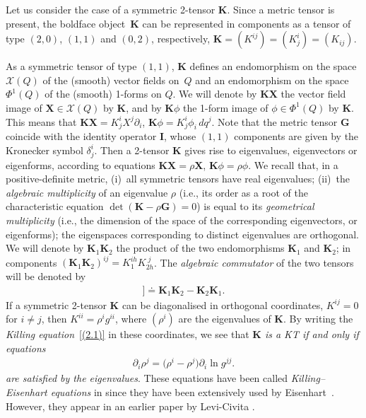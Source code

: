 \documentclass[10pt,a4paper]{amsart}
\def\bs{\boldsymbol}
\numberwithin{equation}{section}
\providecommand{\cal}{\mathcal}
\begin{document}
Let us consider the case of a symmetric 2-tensor $\bs K$. Since a metric tensor is present, the boldface object~$\bs K$ can be represented in components as a tensor of type $(2,0)$, $(1,1)$ and $(0,2)$, respectively, $\bs K= (K^{ij})=(K^i_j)=(K_{ij})$.

As a symmetric tensor of type $(1,1)$, $\bs K$ def\/ines an endomorphism on the space $\cal X(Q)$ of the (smooth) vector f\/ields on~$Q$ and an endomorphism on the space $\Phi^1(Q)$ of the (smooth) 1-forms on $Q$. We will denote by
$\bs K\bs X$ the vector f\/ield image of $\bs X\in\cal X(Q)$ by $\bs K$, and by $\bs K\phi$ the 1-form
image of $\phi\in\Phi^1(Q)$ by $\bs K$. This means that $\bs K\bs X=K^i_jX^j \partial_i$, $\bs K\phi= K^i_j\phi_i\,dq^j$.
Note that the metric tensor $\bs G$ coincide with the identity operator $\bs I$,
whose $(1,1)$ components are given by the Kronecker symbol $\delta^i_j$.
Then a 2-tensor $\bs K$ gives rise to eigenvalues, eigenvectors or eigenforms, according to equations
$\bs K\bs X=\rho\bs X$, $\bs K\phi=\rho \phi$. We recall that, in a positive-def\/inite metric, (i)~all symmetric tensors have real eigenvalues; (ii)~the {\it algebraic multiplicity} of an eigenvalue $\rho$ (i.e., its order as a root of the characteristic equation $\det(\bs K-\rho\bs G)=0$) is equal to its {\it geometrical multiplicity}
(i.e., the dimension of the space of the corresponding eigenvectors, or eigenforms); the eigenspaces corresponding to distinct eigenvalues are orthogonal. We will denote by $\bs K_1\bs K_2$ the product of the two endomorphisms $\bs K_1$ and $\bs K_2$; in components $(\bs K_1\bs K_2)^{ij}=K_1^{ih}K_{2h}^{\;j}$. The {\it algebraic commutator} of the two tensors will be denoted by
\begin{gather*}
[ \! [\bs K_1,\bs K_2] \! ]\doteq \bs K_1\bs K_2-\bs K_2\bs K_1.
\end{gather*}
If a symmetric 2-tensor $\bs K$ can be diagonalised in orthogonal coordinates, $K^{ij}=0$ for $i\neq j$, then $K^{ii}=\rho^i g^{ii}$, where $(\rho^i)$ are the eigenvalues of $\bs K$. By writing the {\it Killing equation}~\eqref{(2.1)} in these coordinates, we see that {\it $\bs K$ is a KT if and only if
equations
\begin{gather}
\partial_i\rho^j=\big(\rho^i-\rho^j\big) \partial_i \ln g^{jj}.
\label{(2.2)}
\end{gather}
are satisf\/ied by the eigenvalues}. These equations have been called  {\it Killing--Eisenhart equations} in \cite{BCR-2002a} since they have been extensively used by Eisenhart~\cite{Eisenhart-1949}. However, they appear in an earlier paper by Levi-Civita \cite[p.~285]{LC-1896}.
\end{document}
